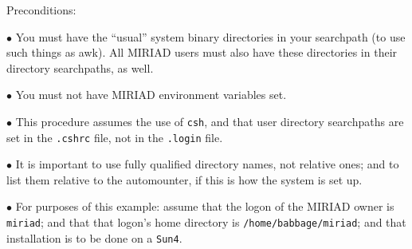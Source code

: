 
Preconditions:
\item{$\bullet$} You must have the ``usual'' system binary directories in
your searchpath (to use such things as awk).  All MIRIAD users must also
have these directories in their directory searchpaths, as well.
\item{$\bullet$} You must not have MIRIAD environment variables set.
\item{$\bullet$} This procedure assumes the use of {\tt csh}, and that user
directory searchpaths are set in the {\tt .cshrc} file, not in the
{\tt .login} file.
\item{$\bullet$} It is important to use fully qualified directory names,
not relative ones; and to list them relative to the automounter, if this
is how the system is set up.
\item{$\bullet$} For purposes of this example:  assume that the logon of
the MIRIAD owner is {\tt miriad}; and that that logon's home directory
is {\tt /home/babbage/miriad}; and that installation is to be done on a
{\tt Sun4}.

